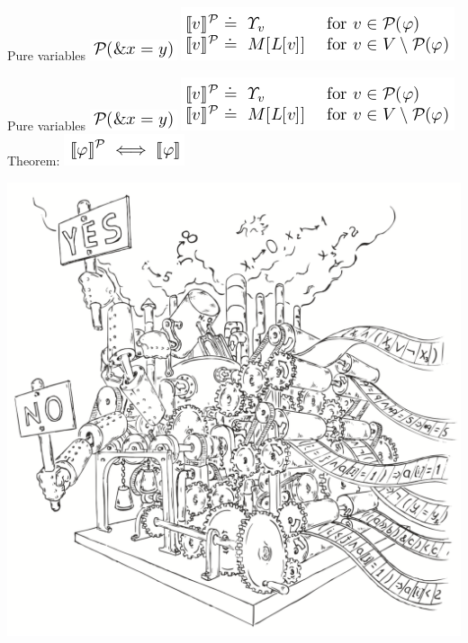 \documentclass{beamer}
\begin{document}
\begin{frame}{Pure variables}
\includegraphics[scale=0.5]{pure1.png}\newline
\includegraphics[scale=0.5]{pure2.png}\newline
\end{frame}

\begin{frame}{Pure variables}
\includegraphics[scale=0.5]{pure1.png}\newline
\includegraphics[scale=0.5]{pure2.png}\newline
Theorem:\newline
\includegraphics[scale=0.5]{theorem.png}\newline
\end{frame}

\begin{frame}
\includegraphics[scale=0.5]{../decision-procedure.png}
\end{frame}
\end{document}
